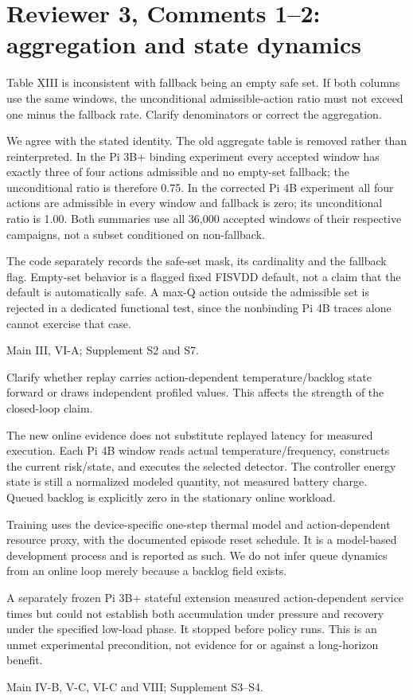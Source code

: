 \documentclass[10pt,a4paper]{article}
\newcommand{\commentbox}[1]{\begin{rcommentbox}#1\end{rcommentbox}}
\newcommand{\responsebox}[1]{\begin{authorresponsebox}#1\end{authorresponsebox}}
\newcommand{\changebox}[1]{\begin{wherebox}#1\end{wherebox}}
\begin{document}
\clearpage
\section*{Reviewer 3, Comments 1--2: aggregation and state dynamics}
\commentbox{Table XIII is inconsistent with fallback being an empty safe set. If both columns use the same windows, the unconditional admissible-action ratio must not exceed one minus the fallback rate. Clarify denominators or correct the aggregation.}
\responsebox{We agree with the stated identity. The old aggregate table is removed rather than reinterpreted. In the Pi 3B+ binding experiment every accepted window has exactly three of four actions admissible and no empty-set fallback; the unconditional ratio is therefore 0.75. In the corrected Pi 4B experiment all four actions are admissible in every window and fallback is zero; its unconditional ratio is 1.00. Both summaries use all 36,000 accepted windows of their respective campaigns, not a subset conditioned on non-fallback.

The code separately records the safe-set mask, its cardinality and the fallback flag. Empty-set behavior is a flagged fixed FISVDD default, not a claim that the default is automatically safe. A max-Q action outside the admissible set is rejected in a dedicated functional test, since the nonbinding Pi 4B traces alone cannot exercise that case.}
\changebox{Main III, VI-A; Supplement S2 and S7.}
\commentbox{Clarify whether replay carries action-dependent temperature/backlog state forward or draws independent profiled values. This affects the strength of the closed-loop claim.}
\responsebox{The new online evidence does not substitute replayed latency for measured execution. Each Pi 4B window reads actual temperature/frequency, constructs the current risk/state, and executes the selected detector. The controller energy state is still a normalized modeled quantity, not measured battery charge. Queued backlog is explicitly zero in the stationary online workload.

Training uses the device-specific one-step thermal model and action-dependent resource proxy, with the documented episode reset schedule. It is a model-based development process and is reported as such. We do not infer queue dynamics from an online loop merely because a backlog field exists.

A separately frozen Pi 3B+ stateful extension measured action-dependent service times but could not establish both accumulation under pressure and recovery under the specified low-load phase. It stopped before policy runs. This is an unmet experimental precondition, not evidence for or against a long-horizon benefit.}
\changebox{Main IV-B, V-C, VI-C and VIII; Supplement S3--S4.}
\end{document}
